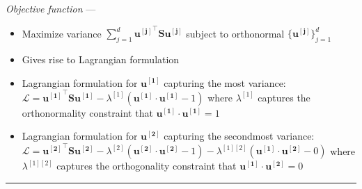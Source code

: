 \emph{Objective function} --- 
\begin{itemize}
    \item Maximize variance $\sum_{j=1}^d \boldsymbol{u^{[j]}}^\intercal \boldsymbol{S} \boldsymbol{u^{[j]}}$ subject to orthonormal $\{\boldsymbol{u^{[j]}}\}_{j=1}^d$
    \item Gives rise to Lagrangian formulation
    \item Lagrangian formulation for $\boldsymbol{u^{[1]}}$ capturing the most variance: $\mathcal{L} = \boldsymbol{u^{[1]}}^\intercal \boldsymbol{S} \boldsymbol{u^{[1]}} - \lambda^{[1]} (\boldsymbol{u^{[1]}} \cdot \boldsymbol{u^{[1]}} - 1)$ where $\lambda^{[1]}$ captures the orthonormality constraint that $\boldsymbol{u^{[1]}} \cdot \boldsymbol{u^{[1]}} = 1$
    \item Lagrangian formulation for $\boldsymbol{u^{[2]}}$ capturing the secondmost variance: $\mathcal{L} = \boldsymbol{u^{[2]}}^\intercal \boldsymbol{S} \boldsymbol{u^{[2]}} - \lambda^{[2]} (\boldsymbol{u^{[2]}} \cdot \boldsymbol{u^{[2]}} - 1) - \lambda^{[1][2]} (\boldsymbol{u^{[1]}} \cdot \boldsymbol{u^{[2]}} - 0)$ where $\lambda^{[1][2]}$ captures the orthogonality constraint that $\boldsymbol{u^{[1]}} \cdot \boldsymbol{u^{[2]}} = 0$
\end{itemize}

{\color{lightgray}\hrule height 0.001mm}

